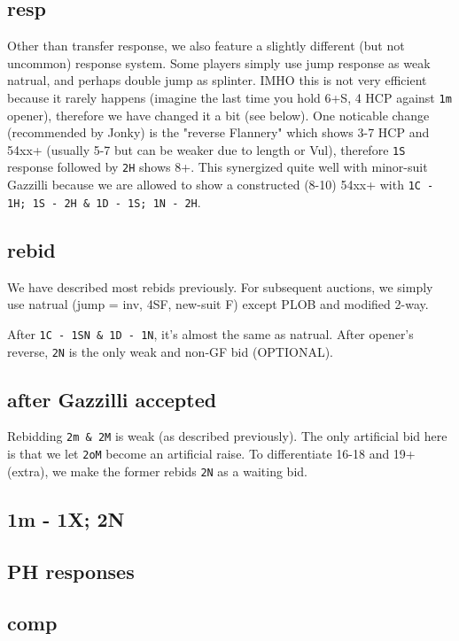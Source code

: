 \subsection{resp}

Other than transfer response, we also feature a slightly different (but not uncommon) response system.
Some players simply use jump response as weak natrual, and perhaps double jump as splinter.
IMHO this is not very efficient because it rarely happens (imagine the last time you hold 6+S, 4 HCP against \texttt{1m} opener),
therefore we have changed it a bit (see below).
One noticable change (recommended by Jonky) is the "reverse Flannery" which shows 3-7 HCP and 54xx+ (usually 5-7 but can be weaker due to length or Vul), therefore \texttt{1S} response followed by \texttt{2H} shows 8+.
This synergized quite well with minor-suit Gazzilli because we are allowed to show a constructed (8-10) 54xx+ with \texttt{1C - 1H; 1S - 2H \& 1D - 1S; 1N - 2H}.


\subsection{rebid}

We have described most rebids previously. For subsequent auctions, we simply use natrual (jump = inv, 4SF, new-suit F) except PLOB and modified 2-way.


After \texttt{1C - 1SN \& 1D - 1N}, it's almost the same as natrual. After opener's reverse, \texttt{2N} is the only weak and non-GF bid (OPTIONAL).


\subsection{after Gazzilli accepted}

Rebidding \texttt{2m \& 2M} is weak (as described previously). 
The only artificial bid here is that we let \texttt{2oM} become an artificial raise.
To differentiate 16-18 and 19+ (extra), we make the former rebids \texttt{2N} as a waiting bid.


\subsection{1m - 1X; 2N}


\subsection{PH responses}


\subsection{comp}


